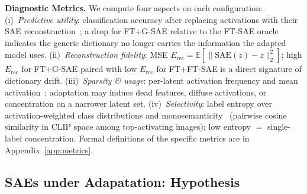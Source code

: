 
\noindent\textbf{Diagnostic Metrics.}
We compute four aspects on each configuration:
(i)~\emph{Predictive utility}: classification accuracy after replacing activations with their SAE reconstruction~\citep{lim2024patchsae}; a drop for FT+G-SAE relative to the FT-SAE oracle indicates the generic dictionary no longer carries the information the adapted model uses.
(ii)~\emph{Reconstruction fidelity}: MSE $E_{\mathrm{rec}}=\mathbb{E}[\|\mathrm{SAE}(z)-z\|_2^2]$; high $E_{\mathrm{rec}}$ for FT+G-SAE paired with low $E_{\mathrm{rec}}$ for FT+FT-SAE is a direct signature of dictionary drift.
(iii)~\emph{Sparsity \& usage}: per-latent activation frequency and mean activation~\citep{cunningham2024sparse,gao2025scaling}; adaptation may induce dead features, diffuse activations, or concentration on a narrower latent set.
(iv)~\emph{Selectivity}: label entropy over activation-weighted class distributions and monosemanticity~\citep{cunningham2024sparse} (pairwise cosine similarity in CLIP space among top-activating images); low entropy $=$ single-label concentration. Formal definitions of the specific metrics are in Appendix~\ref{app:metrics}.

\subsection{SAEs under Adapatation: Hypothesis}
\label{sec:method-problem}

